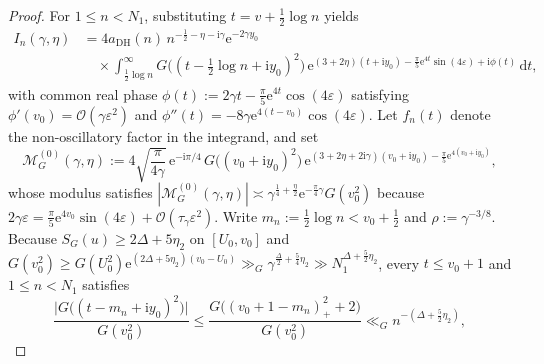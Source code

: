 \documentclass[11pt,a4paper,reqno]{amsart}
\theoremstyle{definition}
\theoremstyle{remark}
\numberwithin{equation}{section}
\newcommand{\dd}{\mathrm{d}}
\newcommand{\ii}{\mathrm{i}}
\newcommand{\ee}{\mathrm{e}}
\begin{document}
\begin{proof}
For $1 \le n < N_1$, substituting $t = v + \frac{1}{2}\log n$ yields
\begin{equation*}
  \begin{aligned}
    I_n(\gamma, \eta)
    &= 4a_{\mathrm{DH}}(n)\,n^{-\frac{1}{2}-\eta-\ii\gamma}\ee^{-2\gamma y_0} \\
    &\quad\times \int_{\frac{1}{2}\log n}^{\infty} G\bigl((t - \tfrac{1}{2}\log n + \ii y_0)^2\bigr)\,
    \ee^{(3+2\eta)(t+\ii y_0) - \frac{\pi}{5}\ee^{4t}\sin(4\varepsilon) + \ii\phi(t)}\,\dd t,
  \end{aligned}
\end{equation*}
with common real phase $\phi(t) := 2\gamma t - \frac{\pi}{5}\ee^{4t}\cos(4\varepsilon)$ satisfying $\phi'(v_0) = \mathcal{O}(\gamma\varepsilon^2)$ and $\phi''(t) = -8\gamma\ee^{4(t-v_0)}\cos(4\varepsilon)$. Let $f_n(t)$ denote the non-oscillatory factor in the integrand, and set
\begin{equation}
  \mathcal{M}_G^{(0)}(\gamma, \eta)
  := 4\sqrt{\frac{\pi}{4\gamma}}\,\ee^{-\ii\pi/4}\,G\bigl((v_0 + \ii y_0)^2\bigr)\,
  \ee^{(3 + 2\eta + 2\ii\gamma)(v_0 + \ii y_0) - \frac{\pi}{5}\ee^{4(v_0 + \ii y_0)}},
  \label{eq:u-saddle-lead}
\end{equation}
whose modulus satisfies $|\mathcal{M}_G^{(0)}(\gamma, \eta)| \asymp \gamma^{\frac{1}{4}+\frac{\eta}{2}}\ee^{-\frac{\pi}{4}\gamma}G(v_0^2)$ because $2\gamma\varepsilon = \frac{\pi}{5}\ee^{4v_0}\sin(4\varepsilon) + \mathcal{O}(\tau_\gamma\varepsilon^2)$. Write $m_n := \frac{1}{2}\log n < v_0 + \frac{1}{2}$ and $\rho := \gamma^{-3/8}$. Because $S_G(u) \ge 2\Delta + 5\eta_2$ on $[U_0, v_0]$ and $G(v_0^2) \ge G(U_0^2)\ee^{(2\Delta + 5\eta_2)(v_0 - U_0)} \gg_G \gamma^{\frac{\Delta}{2} + \frac{5}{4}\eta_2} \gg N_1^{\Delta + \frac{5}{2}\eta_2}$, every $t \le v_0 + 1$ and $1 \le n < N_1$ satisfies
\begin{equation*}
  \frac{\bigl|G\bigl((t - m_n + \ii y_0)^2\bigr)\bigr|}{G(v_0^2)}
  \le \frac{G\bigl((v_0 + 1 - m_n)_+^2 + 2\bigr)}{G(v_0^2)}
  \ll_G n^{-(\Delta + \frac{5}{2}\eta_2)},
\end{equation*}

\end{proof}
\end{document}
